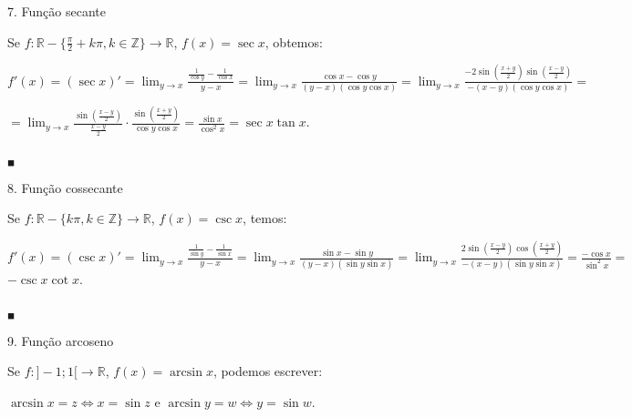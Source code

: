 \documentclass{article}
\begin{document}
{\begin{newpage}
\vspace{0.3cm}
\begin{flushleft}
7. Função secante
\end{flushleft}
\par Se $f:\mathbb{R}-\Big\{\displaystyle{\frac{\pi }{2}} + k\pi, k\in\mathbb{Z}\Big\}\rightarrow\mathbb{R}$, $f(x)=\sec{x}$, obtemos:
\par $ f'(x)=(\sec{x})'=\displaystyle{\lim_{y\to x}} \frac{\frac{1}{\cos{y}} - \frac{1}{\cos{x}}}{y-x} = \displaystyle{\lim_{y\to x}} \frac{\cos{x} - \cos{y}}{(y-x)(\cos{y}\cos{x})} =  \displaystyle{\lim_{y\to x}} \frac{-2\sin{(\frac{x+y}{2})}\sin{(\frac{x-y}{2})}}{-(x-y)(\cos{y}\cos{x})} =$\par \vspace{0.2cm}$= \displaystyle{\lim_{y\to x}} \frac{\sin{(\frac{x-y}{2})}}{\frac{x-y}{2}}\cdot\frac{\sin{(\frac{x+y}{2})}}{\cos{y}\cos{x}} = \frac{\sin{x}}{\cos^2{x}} = \sec{x}\tan{x}.$ \begin{flushright} $_{\blacksquare }$ \end{flushright}
\par
\vspace{0.3cm}
\begin{flushleft}
8. Função cossecante
\end{flushleft}
\par Se $f:\mathbb{R}-\{{k\pi, k\in\mathbb{Z}}\}\rightarrow\mathbb{R}$, $f(x)=\csc{x}$, temos:
\par $f'(x)=(\csc{x})'=\displaystyle{\lim_{y\to x}} \frac{\frac{1}{\sin{y}} - \frac{1}{\sin{x}}}{y-x} = \displaystyle{\lim_{y\to x}} \frac{\sin{x} - \sin{y}}{(y-x)(\sin{y}\sin{x})} = \displaystyle{\lim_{y\to x}} \frac{2\sin{(\frac{x-y}{2})}\cos{(\frac{x+y}{2})}}{-(x-y)(\sin{y}\sin{x})} = \frac{-\cos{x}}{\sin^2{x}} = $\vspace{0.2cm} $-\csc{x}\cot{x}.$\begin{flushright} $_{\blacksquare }$ \end{flushright}
\par
\vspace{0.3cm}
\begin{flushleft}
9. Função arcoseno
\end{flushleft}
\par Se $f:]-1;1[\rightarrow\mathbb{R}$, $f(x)=\arcsin{x}$, podemos escrever:
\par \begin{center} $\arcsin{x}=z\Leftrightarrow x=\sin{z}$ e $\arcsin{y}=w\Leftrightarrow y=\sin{w}$.\end{center}

\end{newpage}}
\end{document}
